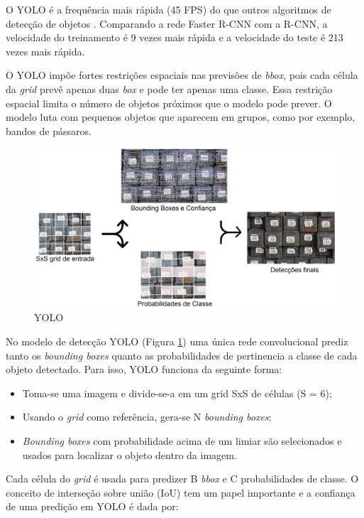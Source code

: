 O YOLO é a frequência mais rápida (45 FPS) do que outros algoritmos de detecção de objetos \cite{yolov3RealTime}. Comparando a rede Faster R-CNN com a  R-CNN, a velocidade do treinamento  é 9 vezes mais rápida e a velocidade do teste é 213 vezes mais rápida. \cite{7960069}

O YOLO impõe fortes restrições espaciais nas previsões de \textit{bbox}, pois cada célula da \textit{grid} prevê apenas duas \textit{box} e pode ter apenas uma classe. Essa restrição espacial limita o número de objetos próximos que o modelo pode prever. O modelo luta com pequenos objetos que aparecem em grupos, como por exemplo, bandos de pássaros. \cite{yolov3RealTime}

\begin{figure}[htbp]
		\centering
		\includegraphics[scale=0.2]{figuras/MachineLearning/yolo.png}
		\caption{YOLO}
		\label{fig:yolo}
\end{figure}

No modelo de detecção YOLO (Figura \ref{fig:yolo}) uma única rede convolucional prediz tanto os \textit{bounding boxes} quanto as probabilidades de pertinencia a classe de cada objeto detectado. Para isso, YOLO funciona da seguinte forma:

\begin{itemize}
    \item Toma-se uma imagem e divide-se-a em um grid SxS de células (S = 6);
    \item Usando o \textit{grid} como referência, gera-se N \textit{bounding boxes};
    \item \textit{Bounding boxes} com probabilidade acima de um limiar são selecionados e usados para localizar o objeto dentro da imagem.
\end{itemize}

Cada célula do  \textit{grid} é usada para predizer B  \textit{bbox} e C probabilidades de classe. O conceito de interseção sobre união (IoU) tem um papel importante e a confiança de uma predição em YOLO é dada por:

